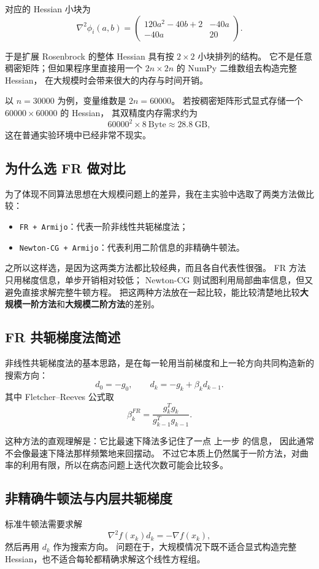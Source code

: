 \documentclass[12pt,a4paper]{ctexart}
\begin{document}
对应的 Hessian 小块为
\[
\nabla^2 \phi_i(a,b)=
\begin{pmatrix}
120a^2-40b+2 & -40a\\
-40a & 20
\end{pmatrix}.
\]

于是扩展 Rosenbrock 的整体 Hessian 具有按 \(2\times 2\) 小块排列的结构。
它不是任意稠密矩阵；但如果程序里直接用一个 \(2n\times 2n\) 的 NumPy 二维数组去构造完整 Hessian，
在大规模时会带来很大的内存与时间开销。

以 \(n=30000\) 为例，变量维数是 \(2n=60000\)。
若按稠密矩阵形式显式存储一个 \(60000\times 60000\) 的 Hessian，
其双精度内存需求约为
\[
60000^2\times 8\ \text{Byte}\approx 28.8\ \text{GB},
\]
这在普通实验环境中已经非常不现实。

\subsection{为什么选 FR 做对比}
为了体现不同算法思想在大规模问题上的差异，我在主实验中选取了两类方法做比较：
\begin{itemize}
  \item \texttt{FR + Armijo}：代表一阶非线性共轭梯度法；
  \item \texttt{Newton-CG + Armijo}：代表利用二阶信息的非精确牛顿法。
\end{itemize}

之所以这样选，是因为这两类方法都比较经典，而且各自代表性很强。
FR 方法只用梯度信息，单步开销相对较低；
Newton-CG 则试图利用局部曲率信息，但又避免直接求解完整牛顿方程。
把这两种方法放在一起比较，能比较清楚地比较\textbf{大规模一阶方法}和\textbf{大规模二阶方法}的差别。

\subsection{FR 共轭梯度法简述}
非线性共轭梯度法的基本思路，是在每一轮用当前梯度和上一轮方向共同构造新的搜索方向：
\[
d_0=-g_0,\qquad d_k=-g_k+\beta_k d_{k-1}.
\]
其中 Fletcher--Reeves 公式取
\[
\beta_k^{FR}=\frac{g_k^T g_k}{g_{k-1}^T g_{k-1}}.
\]

这种方法的直观理解是：它比最速下降法多记住了一点 上一步 的信息，
因此通常不会像最速下降法那样频繁地来回摆动。
不过它本质上仍然属于一阶方法，对曲率的利用有限，所以在病态问题上迭代次数可能会比较多。

\subsection{非精确牛顿法与内层共轭梯度}
标准牛顿法需要求解
\[
\nabla^2 f(x_k) d_k = - \nabla f(x_k),
\]
然后再用 \(d_k\) 作为搜索方向。
问题在于，大规模情况下既不适合显式构造完整 Hessian，也不适合每轮都精确求解这个线性方程组。
\end{document}
